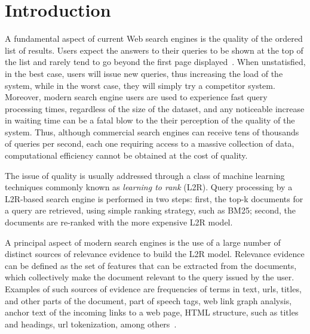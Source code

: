 \documentclass[preprint,12pt,3p]{elsarticle}
\begin{document}


\section{Introduction}
\label{intro}

A fundamental aspect of current Web search engines is the quality of the ordered list of results. Users expect the answers to their queries to be shown at the top of the list and rarely tend to go beyond the first page displayed~\cite{saraiva2001rank}. When unstatisfied, in the best case, users will issue new queries, thus increasing the load of the system, while in the worst case, they will simply try a competitor system. Moreover, modern search engine users are used to experience fast query processing times, regardless of the size of the dataset, and any noticeable increase in waiting time can be a fatal blow to the their perception of the quality of the system. Thus, although commercial search engines can receive tens of thousands of queries per second, each one requiring access to a massive collection of data, computational efficiency cannot be obtained at the cost of quality. 

The issue of quality is usually addressed through a class of machine learning techniques commonly known as \textit{learning to rank} (L2R). Query processing by a L2R-based search engine is performed in two steps: first, the top-k documents for a query are retrieved, using simple ranking strategy, such as BM25; second, the documents are re-ranked with the more expensive L2R model.

A principal aspect of modern search engines is the use of a large number of distinct sources of relevance evidence to build the L2R model. Relevance evidence can be defined as the set of features that can be extracted from the documents, which collectively make the document relevant to the query issued by the user. Examples of such sources of evidence are frequencies of terms in text, urls, titles, and other parts of the document, part of speech tags, web link graph analysis, anchor text of the incoming links to a web page, HTML structure, such as titles and headings, url tokenization, among others~\cite{baezaribeiro2011modinforet}. 
\end{document}
